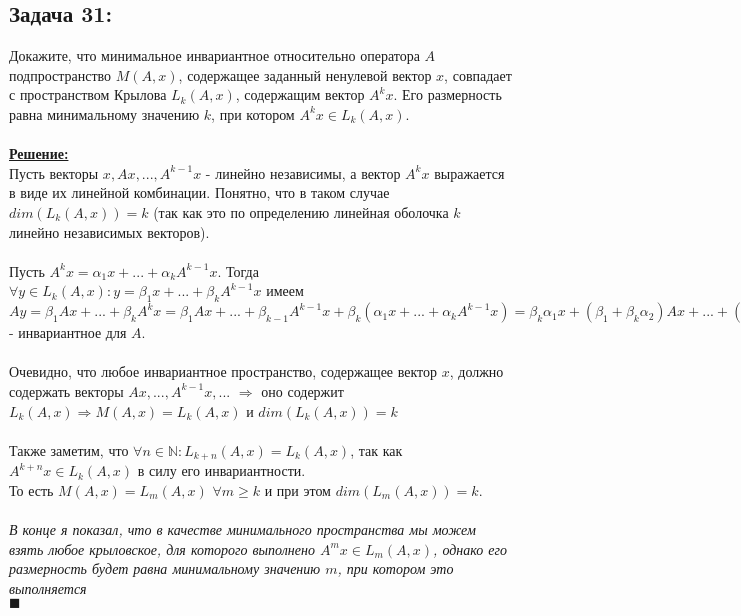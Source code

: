 \documentclass[a4paper,12pt,titlepage,final]{article}
\begin{document}
\subsection*{Задача 31:}
\noindent Докажите, что минимальное инвариантное относительно оператора $A$ подпространство $M(A, x)$,
содержащее заданный ненулевой вектор $x$, совпадает с пространством Крылова $L_k(A, x)$, содержащим 
вектор $A^k x$. Его размерность равна минимальному значению $k$, при котором $A^k x \in L_k(A, x)$. \\ \\
\textbf{\underline{Решение:}} \\
Пусть векторы $x, Ax, ... , A^{k - 1} x$ - линейно независимы, а вектор $A^k x$ выражается в виде их линейной комбинации. 
Понятно, что в таком случае $dim(L_k(A, x)) = k$ (так как это по определению линейная оболочка $k$ линейно независимых 
векторов). \\ \\
Пусть $A^k x = \alpha_1 x + ... + \alpha_k A^{k - 1} x$. Тогда $\forall y \in L_k(A, x): 
y = \beta_1 x + ... + \beta_k A^{k - 1} x$ имеем $Ay = \beta_1 Ax + ... + \beta_k A^k x = 
\beta_1 Ax + ... + \beta_{k - 1} A^{k - 1} x + \beta_k(\alpha_1 x + ... + \alpha_k A^{k - 1} x) = 
\beta_k \alpha_1 x + (\beta_1 + \beta_k \alpha_2) Ax + ... + (\beta_{k - 1} + \beta_k \alpha_k) A^{k - 1} x \in L_k(A, x) \Rightarrow 
L_k(A, x)$ - инвариантное для $A$. \\ \\
Очевидно, что любое инвариантное пространство, содержащее вектор $x$, должно содержать векторы $Ax, ... , 
A^{k - 1} x, ...$ $\Rightarrow$ оно содержит $L_k(A, x) \Rightarrow M(A, x) = L_k(A, x)$ и $dim(L_k(A, x)) = k$ \\ \\
Также заметим, что $\forall n \in \mathbb{N}: L_{k + n}(A, x) = L_k(A, x)$, так как $A^{k + n} x \in L_k(A, x)$ в силу его инвариантности. \\
То есть $M(A, x) = L_m(A, x)$ $\forall m \geq k$ и при этом $dim(L_m(A, x)) = k$. \\ \\
\textit{В конце я показал, что в качестве минимального пространства мы можем взять любое крыловское, для которого выполнено 
$A^m x \in L_m(A, x)$, однако его размерность будет равна минимальному значению $m$, при котором это выполняется} \\
$\blacksquare$ \\ \\ \\ 
\end{document}

